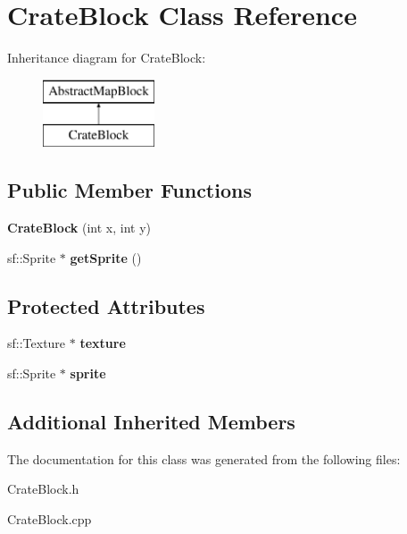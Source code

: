 \hypertarget{class_crate_block}{}\section{Crate\+Block Class Reference}
\label{class_crate_block}
Inheritance diagram for Crate\+Block\+:\begin{figure}[H]
\begin{center}
\leavevmode
\includegraphics[height=2.000000cm]{class_crate_block}
\end{center}
\end{figure}
\subsection*{Public Member Functions}
\begin{DoxyCompactItemize}
\item 
\mbox{\label{class_crate_block_af425285a43dc8a3eaf63a1abf91987cf}} 
{\bfseries Crate\+Block} (int x, int y)
\item 
\mbox{\label{class_crate_block_a1f478270194247d4e1f7f4b5eb883be9}} 
sf\+::\+Sprite $\ast$ {\bfseries get\+Sprite} ()
\end{DoxyCompactItemize}
\subsection*{Protected Attributes}
\begin{DoxyCompactItemize}
\item 
\mbox{\label{class_crate_block_a94ec4c6400389af2e8f1cd532c17eb5e}} 
sf\+::\+Texture $\ast$ {\bfseries texture}
\item 
\mbox{\label{class_crate_block_af4bed3d444d90dad4dd8a10c032c9724}} 
sf\+::\+Sprite $\ast$ {\bfseries sprite}
\end{DoxyCompactItemize}
\subsection*{Additional Inherited Members}


The documentation for this class was generated from the following files\+:\begin{DoxyCompactItemize}
\item 
Crate\+Block.\+h\item 
Crate\+Block.\+cpp\end{DoxyCompactItemize}
